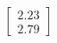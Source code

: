 \documentclass[preview]{standalone}
\begin{document}
\begin{align*}
\begin{bmatrix} 2.23 \\ 2.79 \end{bmatrix}
\end{align*}
\end{document}
